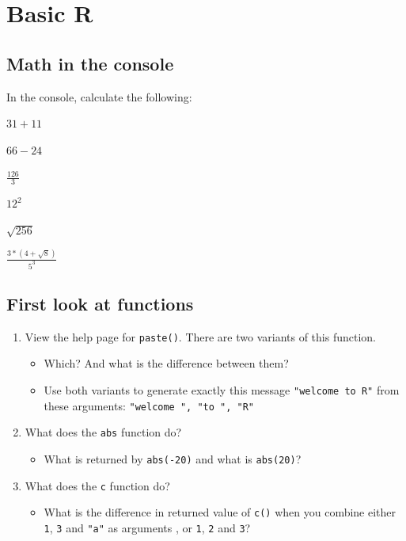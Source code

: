 \documentclass[]{book}
\providecommand{\tightlist}{%
  \setlength{\itemsep}{0pt}\setlength{\parskip}{0pt}}
\begin{document}
\hypertarget{basic-r}{%
\section{Basic R}\label{basic-r}}

\hypertarget{math-in-the-console}{%
\subsection{Math in the console}\label{math-in-the-console}}

In the console, calculate the following:

\(31 + 11\)

\(66 - 24\)

\(\frac{126}{3}\)

\(12^2\)

\(\sqrt{256}\)

\(\frac{3*(4+\sqrt{8})}{5^3}\)

\hypertarget{first-look-at-functions}{%
\subsection{First look at functions}\label{first-look-at-functions}}

\begin{enumerate}
\def\labelenumi{\arabic{enumi}.}
\tightlist
\item
  View the help page for \texttt{paste()}. There are two variants of this function.

  \begin{itemize}
  \tightlist
  \item
    Which? And what is the difference between them?
  \item
    Use both variants to generate exactly this message \texttt{"welcome\ to\ R"} from these arguments: \texttt{"welcome\ ",\ "to\ ",\ "R"}
  \end{itemize}
\item
  What does the \texttt{abs} function do?

  \begin{itemize}
  \tightlist
  \item
    What is returned by \texttt{abs(-20)} and what is \texttt{abs(20)}?\\
  \end{itemize}
\item
  What does the \texttt{c} function do?

  \begin{itemize}
  \tightlist
  \item
    What is the difference in returned value of \texttt{c()} when you combine either \texttt{1}, \texttt{3} and \texttt{"a"} as arguments , or \texttt{1}, \texttt{2} and \texttt{3}?
  \end{itemize}
\end{enumerate}
\end{document}
